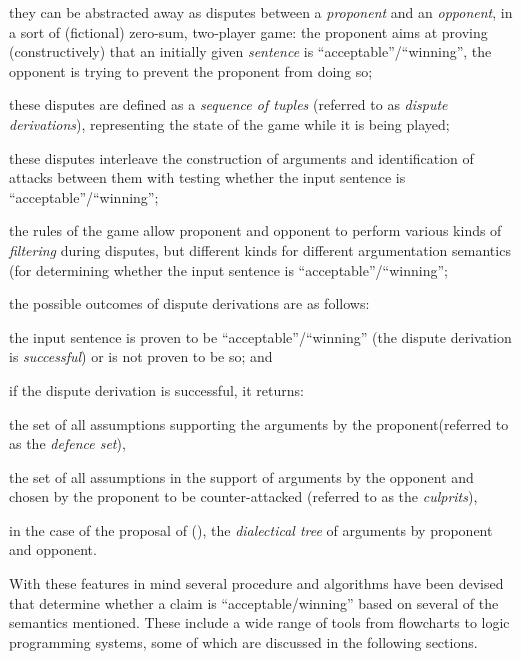 \begin{itemize*}
\item they can be abstracted away as disputes between a \emph{proponent} and an \emph{opponent}, in a sort of (fictional) zero-sum, two-player game: the proponent aims at proving (constructively) that an initially given \emph{sentence} is ``acceptable''/``winning'', the opponent is trying to prevent the proponent from doing so;
\item these disputes are defined as a \emph{sequence of tuples} (referred to as \emph{dispute derivations}), representing the state of the game while it is being played;
\item these disputes interleave the construction of arguments and identification of attacks between them with testing whether the input sentence is ``acceptable''/``winning'';
\item the rules of the game allow proponent and opponent to perform various kinds of \emph{filtering} during disputes, but different kinds for different argumentation semantics (for determining whether the input sentence is ``acceptable''/``winning'';
\item the possible outcomes of dispute derivations are as follows:
\begin{itemize*}
\item the input sentence is proven to be ``acceptable''/``winning'' (the dispute derivation is \emph{successful}) or is not proven to be so; and
\item if the dispute derivation is successful, it returns:
\begin{enumerate*}
\item the set of all assumptions supporting the arguments by the proponent(referred to as the \emph{defence set}),
\item the set of all assumptions in the support of arguments by the opponent and chosen by the proponent to be counter-attacked (referred to as the \emph{culprits}),
\item in the case of the proposal of (\cite{proxdd}), the \emph{dialectical tree} of arguments by proponent and opponent.
\end{enumerate*}
\end{itemize*}
\end{itemize*}

With these features in mind several procedure and algorithms have been devised that determine whether a claim is ``acceptable/winning'' based on several of the semantics mentioned. These include a wide range of tools from flowcharts to logic programming systems, some of which are discussed in the following sections.

